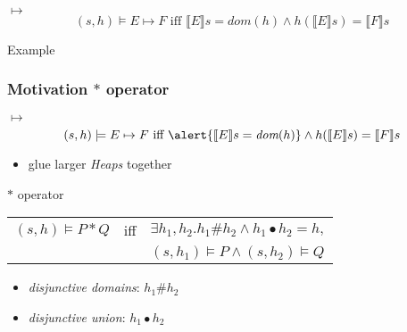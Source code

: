 \documentclass{beamer}
\begin{document}
	\begin{frame}[fragile]
	\frametitle{}
	\begin{block}{$\mapsto$}
		$$(s,h)\models E\mapsto F\text{ iff }\llbracket E\rrbracket s=\textit{dom}(h)\land h(\llbracket E\rrbracket s) = \llbracket F\rrbracket s$$
	\end{block}
	\begin{exampleblock}{Example}
	\begin{minipage}{0.5\textwidth}
	\end{minipage}\noindent
	\begin{minipage}{0.5\textwidth}
	\end{minipage}
	\end{exampleblock}
	\end{frame}

	\begin{frame}
	\frametitle{Motivation $\ast$ operator}
	\begin{block}{$\mapsto$}
		$$(s,h)\models E\mapsto F\text{ iff }\alert{\llbracket E\rrbracket s=\textit{dom}(h)}\land h(\llbracket E\rrbracket s) = \llbracket F\rrbracket s$$
	\end{block}
	\begin{itemize}
		\item glue larger \emph{Heaps} together
	\end{itemize}
	\begin{block}{$\ast$ operator}
		\begin{center}
		\begin{tabular}{lcl}
		$(s,h)\models P\ast Q$ & iff & $\exists h_1,h_2.h_1\#h_2\land h_1\bullet h_2=h,$\\
		                       &     & $(s,h_1)\models P\land (s,h_2)\models Q$
		\end{tabular}
		\end{center}
		\begin{itemize}
			\item \emph{disjunctive domains}: $h_1\# h_2$
			\item \emph{disjunctive union}: $h_1\bullet h_2$
		\end{itemize}
	\end{block}
	\end{frame}
\end{document}

